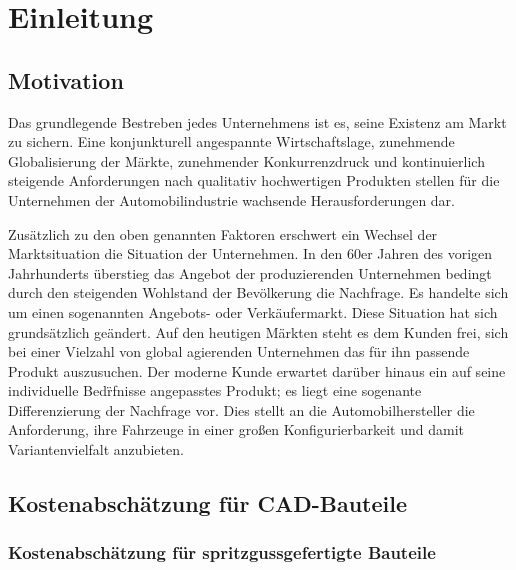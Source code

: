 

\chapter{Einleitung}
\label{cha:Einleitung}
 		
\section{Motivation}

Das grundlegende Bestreben jedes Unternehmens ist es, seine Existenz am Markt zu sichern. Eine konjunkturell angespannte Wirtschaftslage, zunehmende Globalisierung der M\"arkte, zunehmender Konkurrenzdruck und kontinuierlich steigende
Anforderungen nach qualitativ hochwertigen Produkten stellen für die Unternehmen der Automobilindustrie wachsende Herausforderungen dar. 

Zus\"atzlich zu den oben genannten Faktoren erschwert ein Wechsel der Marktsituation die Situation der Unternehmen. In den 60er Jahren des vorigen Jahrhunderts \"uberstieg das Angebot der produzierenden Unternehmen bedingt durch den steigenden Wohlstand der Bev\"olkerung die Nachfrage. Es handelte sich um einen sogenannten Angebots- oder Verk\"aufermarkt. Diese Situation hat sich grunds\"atzlich ge\"andert. Auf den heutigen M\"arkten steht es dem Kunden frei, sich bei einer Vielzahl von global agierenden Unternehmen das f\"ur ihn passende Produkt auszusuchen. Der moderne Kunde erwartet dar\"uber hinaus ein auf seine individuelle Bed\"rfnisse angepasstes Produkt; es liegt eine sogenante Differenzierung der Nachfrage vor. Dies stellt an die Automobilhersteller die Anforderung, ihre Fahrzeuge in einer gro{\ss}en Konfigurierbarkeit und damit Variantenvielfalt anzubieten. 
 
\section{Kostenabsch\"atzung f\"ur CAD-Bauteile}

\subsection{Kostenabsch\"atzung f\"ur spritzgussgefertigte Bauteile}

